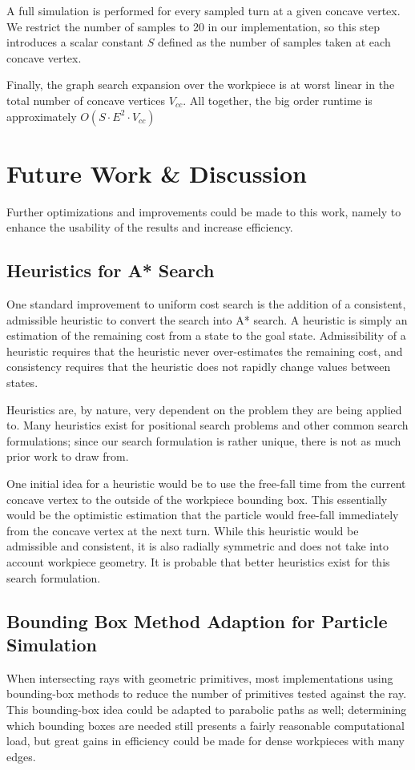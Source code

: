 A full simulation is performed for every sampled turn at a given concave vertex. We restrict the number of samples to 20 in our implementation, so this step introduces a scalar constant $S$ defined as the number of samples taken at each concave vertex.

Finally, the graph search expansion over the workpiece is at worst linear in the total number of concave vertices $V_{cc}$. All together, the big order runtime is approximately $O(S \cdot E^2 \cdot V_{cc})$

\section{Future Work \& Discussion}

Further optimizations and improvements could be made to this work, namely to enhance the usability of the results and increase efficiency.

	\subsection{Heuristics for A* Search}

One standard improvement to uniform cost search is the addition of a consistent, admissible heuristic to convert the search into A* search. A heuristic is simply an estimation of the remaining cost from a state to the goal state. Admissibility of a heuristic requires that the heuristic never over-estimates the remaining cost, and consistency requires that the heuristic does not rapidly change values between states.

Heuristics are, by nature, very dependent on the problem they are being applied to. Many heuristics exist for positional search problems and other common search formulations; since our search formulation is rather unique, there is not as much prior work to draw from.

One initial idea for a heuristic would be to use the free-fall time from the current concave vertex to the outside of the workpiece bounding box. This essentially would be the optimistic estimation that the particle would free-fall immediately from the concave vertex at the next turn. While this heuristic would be admissible and consistent, it is also radially symmetric and does not take into account workpiece geometry. It is probable that better heuristics exist for this search formulation.

	\subsection{Bounding Box Method Adaption for Particle Simulation}

When intersecting rays with geometric primitives, most implementations using bounding-box methods to reduce the number of primitives tested against the ray. This bounding-box idea could be adapted to parabolic paths as well; determining which bounding boxes are needed still presents a fairly reasonable computational load, but great gains in efficiency could be made for dense workpieces with many edges.
